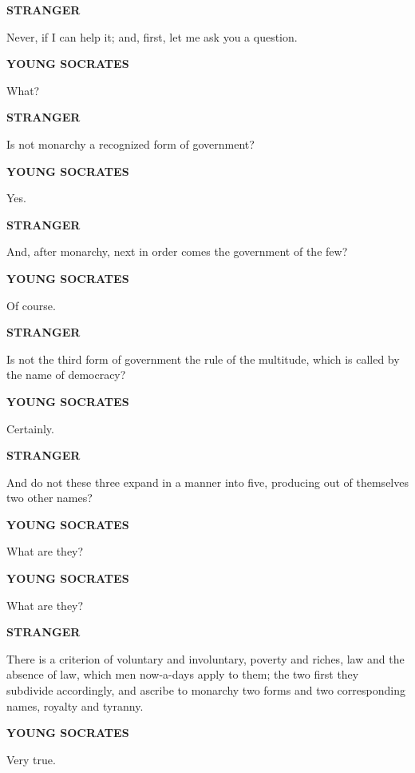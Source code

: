\documentclass[11pt,letter]{article}
\begin{document}
\par \textbf{STRANGER}
\par   Never, if I can help it; and, first, let me ask you a question.

\par \textbf{YOUNG SOCRATES}
\par   What?

\par \textbf{STRANGER}
\par   Is not monarchy a recognized form of government?

\par \textbf{YOUNG SOCRATES}
\par   Yes.

\par \textbf{STRANGER}
\par   And, after monarchy, next in order comes the government of the few?

\par \textbf{YOUNG SOCRATES}
\par   Of course.

\par \textbf{STRANGER}
\par   Is not the third form of government the rule of the multitude, which is called by the name of democracy?

\par \textbf{YOUNG SOCRATES}
\par   Certainly.

\par \textbf{STRANGER}
\par   And do not these three expand in a manner into five, producing out of themselves two other names?

\par \textbf{YOUNG SOCRATES}
\par   What are they?

\par \textbf{YOUNG SOCRATES}
\par   What are they?

\par \textbf{STRANGER}
\par   There is a criterion of voluntary and involuntary, poverty and riches, law and the absence of law, which men now-a-days apply to them; the two first they subdivide accordingly, and ascribe to monarchy two forms and two corresponding names, royalty and tyranny.

\par \textbf{YOUNG SOCRATES}
\par   Very true.
\end{document}
